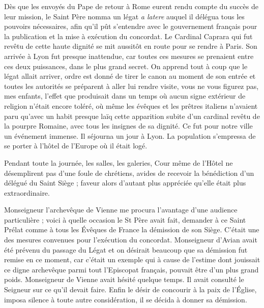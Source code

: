 \documentclass[11pt,a4paper]{report}
\begin{document}
Dès que les envoyés du Pape de retour à Rome eurent rendu compte du succès de leur mission, le Saint Père nomma un légat \textit{a latere} auquel il délégua tous les pouvoirs nécessaires, afin qu'il pût s'entendre avec le gouvernement français pour la publication et la mise à exécution du concordat. Le Cardinal Caprara qui fut revêtu de cette haute dignité se mit aussitôt en route pour se rendre à Paris. Son arrivée à Lyon fut presque inattendue, car toutes ces mesures se prenaient entre ces deux puissances, dans le plus grand secret. On apprend tout à coup que le légat allait arriver, ordre est donné de tirer le canon au moment de son entrée et toutes les autorités se préparent à aller lui rendre visite, vous ne vous figurez pas, mes enfants, l'effet que produisait dans un temps où aucun signe extérieur de religion n'était encore toléré, où même les évêques et les prêtres italiens n'avaient paru qu'avec un habit presque laïq cette apparition subite d'un cardinal revêtu de la pourpre Romaine, avec tous les insignes de sa dignité. Ce fut pour notre ville un événement immense. Il séjourna un jour à Lyon. La population s'empressa de se porter à l'hôtel de l'Europe où il était logé.

Pendant toute la journée, les salles, les galeries, Cour même de l'Hôtel ne désemplirent pas d'une foule de chrétiens, avides de recevoir la bénédiction d'un délégué du Saint Siège ; faveur alors d'autant plus appréciée qu'elle était plus extraordinaire.

Monseigneur l'archevêque de Vienne me procura l'avantage d'une audience particulière ; voici à quelle occasion le St Père avait fait, demander à ce Saint Prélat comme à tous les Évêques de France la démission de son Siège. C'était une des mesures convenues pour l'exécution du concordat. Monseigneur d'Avian avait été prévenu du passage du Légat et on désirait beaucoup que sa démission fut remise en ce moment, car c'était un exemple qui à cause de l'estime dont jouissait ce digne archevêque parmi tout l'Episcopat français, pouvait être d'un plus grand poids. Monseigneur de Vienne avait hésité quelque temps. Il avait consulté le Seigneur sur ce qu'il devait faire. Enfin le désir de concourir à la paix de l'Église, imposa silence à toute autre considération, il se décida à donner sa démission.
\end{document}
